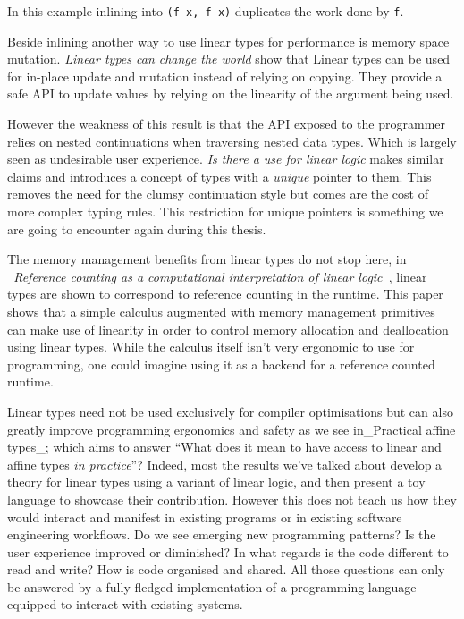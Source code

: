 \documentclass[
]{article}
\begin{document}
In this example inlining into \texttt{(f\ x,\ f\ x)} duplicates the work
done by \texttt{f}.

Beside inlining another way to use linear types for performance is
memory space mutation. \emph{Linear types can change the
world}\cite{linear_types_update} show that Linear types can be used for
in-place update and mutation instead of relying on copying. They provide
a safe API to update values by relying on the linearity of the argument
being used.

However the weakness of this result is that the API exposed to the
programmer relies on nested continuations when traversing nested data
types. Which is largely seen as undesirable user experience. \emph{Is
there a use for linear logic}\cite{linear_use} makes similar claims and
introduces a concept of types with a \emph{unique} pointer to them. This
removes the need for the clumsy continuation style but comes are the
cost of more complex typing rules. This restriction for unique pointers
is something we are going to encounter again during this thesis.

The memory management benefits from linear types do not stop here, in
\emph{~Reference counting as a computational interpretation of linear
logic~}\cite{linear_ref_count}, linear types are shown to correspond to
reference counting in the runtime. This paper shows that a simple
calculus augmented with memory management primitives can make use of
linearity in order to control memory allocation and deallocation using
linear types. While the calculus itself isn't very ergonomic to use for
programming, one could imagine using it as a backend for a reference
counted runtime.

Linear types need not be used exclusively for compiler optimisations but
can also greatly improve programming ergonomics and safety as we see
in\_Practical affine types\_\cite{affine_types}; which aims to answer
``What does it mean to have access to linear and affine types \emph{in
practice}''? Indeed, most the results we've talked about develop a
theory for linear types using a variant of linear logic, and then
present a toy language to showcase their contribution. However this does
not teach us how they would interact and manifest in existing programs
or in existing software engineering workflows. Do we see emerging new
programming patterns? Is the user experience improved or diminished? In
what regards is the code different to read and write? How is code
organised and shared. All those questions can only be answered by a
fully fledged implementation of a programming language equipped to
interact with existing systems.
\end{document}
